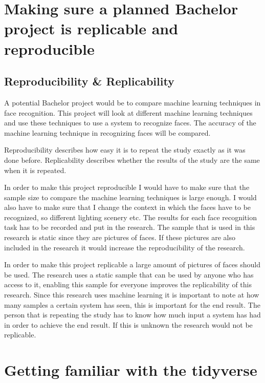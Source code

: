 \documentclass[11pt]{article}
\begin{document}
\section{Making sure a planned Bachelor project is replicable and reproducible}
\label{sec:orgcd5aca1}
\subsection{Reproducibility \& Replicability}
\label{sec:org68390e8}
A potential Bachelor project would be to compare machine learning
techniques in face recognition. This project will look at different
machine learning techniques and use these techniques to use a system
to recognize faces. The accuracy of the machine learning technique in
recognizing faces will be compared.



Reproducibility describes how easy it is to repeat the study exactly
as it was done before. Replicability describes whether the results of
the study are the same when it is repeated.


In order to make this project reproducible I would have to make sure
that the sample size to compare the machine learning techniques is
large enough. I would also have to make sure that I change the context
in which the faces have to be recognized, so different lighting
scenery etc. The results for each face recognition task has to be
recorded and put in the research. The sample that is used in this
research is static since they are pictures of faces. If these pictures
are also included in the research it would increase the
reproducibility of the research.


In order to make this project replicable a large amount of pictures of
faces should be used. The research uses a static sample that can be
used by anyone who has access to it, enabling this sample for everyone
improves the replicability of this research. Since this research uses
machine learning it is important to note at how many samples a certain
system has seen, this is important for the end result. The person that
is repeating the study has to know how much input a system has had in
order to achieve the end result. If this is unknown the research would
not be replicable.


\section{Getting familiar with the tidyverse}
\label{sec:org6ded9e4}
\end{document}
